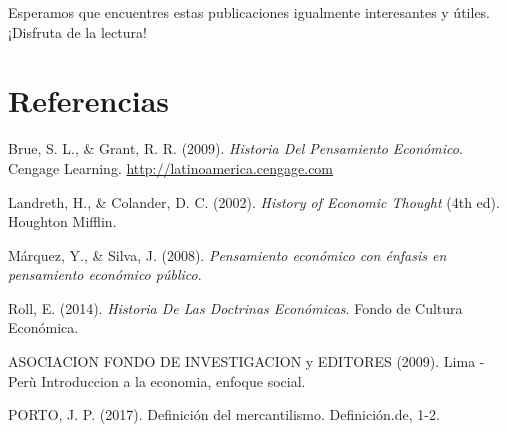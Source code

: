 \documentclass[
  stu,
  floatsintext,
  longtable,
  a4paper,
  nolmodern,
  notxfonts,
  notimes,
  12pt,
  colorlinks=true,linkcolor=blue,citecolor=blue,urlcolor=blue]{apa7}
\newlength{\cslhangindent}
\newenvironment{CSLReferences}[2] %
 {\begin{list}{}{%
  \setlength{\itemindent}{0pt}
  \setlength{\leftmargin}{0pt}
  \setlength{\parsep}{0pt}
  \ifodd #1
   \setlength{\leftmargin}{\cslhangindent}
   \setlength{\itemindent}{-1\cslhangindent}
  \fi
  \setlength{\itemsep}{#2\baselineskip}}}
 {\end{list}}
\begin{document}
Esperamos que encuentres estas publicaciones igualmente interesantes y
útiles. ¡Disfruta de la lectura!

\section{Referencias}\label{referencias}

\protect{}\label{refs}
\begin{CSLReferences}{1}{0}
Brue, S. L., \& Grant, R. R. (2009). \emph{Historia {Del Pensamiento
Económico}}. Cengage Learning. \url{http://latinoamerica.cengage.com}

Landreth, H., \& Colander, D. C. (2002). \emph{History of Economic
Thought} (4th ed). Houghton Mifflin.

Márquez, Y., \& Silva, J. (2008). \emph{‪Pensamiento económico con
énfasis en pensamiento económico público‬}.

Roll, E. (2014). \emph{Historia De Las Doctrinas Económicas}. Fondo de
Cultura Económica.

\end{CSLReferences}

ASOCIACION FONDO DE INVESTIGACION y EDITORES (2009). Lima - Perù
\hspace{0pt}Introduccion a la economia, enfoque social.

PORTO, J. P. (2017). Definición del mercantilismo. Definición.de, 1-2.
\end{document}
